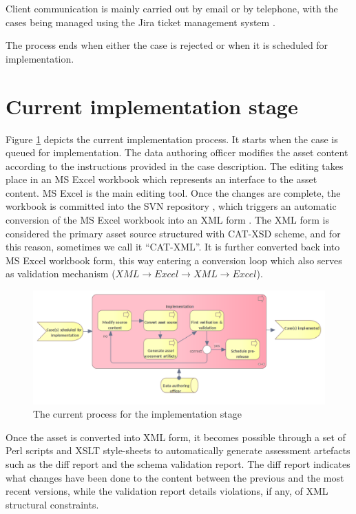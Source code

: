 	Client communication is mainly carried out by email or by telephone, with the cases being managed using the Jira ticket management system \citep{jira}. 
	
	The process ends when either the case is rejected or when it is scheduled for implementation. 

	
	\section{Current implementation stage}
	\label{sec:implementation-current}
		
	Figure \ref{fig:implementation-current} depicts the current implementation process. It starts when the case is queued for implementation. The data authoring officer modifies the asset content according to the instructions provided in the case description. The editing takes place in an MS Excel \citep{excel} workbook which represents an interface to the asset content. MS Excel is the main editing tool. Once the changes are complete, the workbook is committed into the SVN repository \citep{svn}, which triggers an automatic conversion of the MS Excel workbook into an XML form \cite{xml11-spec}. The XML form is considered the primary asset source structured with CAT-XSD scheme, and for this reason, sometimes we call it ``CAT-XML''. It is further converted back into MS Excel workbook form, this way entering a conversion loop which also serves as validation mechanism ($XML \rightarrow Excel \rightarrow XML \rightarrow Excel$).
	
	\begin{figure}[h]
		\centering
		\includegraphics[width=.9\textwidth]{images/business/current/Implementation.png}
		\caption{The current process for the implementation stage}
		\label{fig:implementation-current}
	\end{figure}
	
	Once the asset is converted into XML form, it becomes possible through a set of Perl scripts and XSLT style-sheets \citep{xslt3-Kay} to automatically generate assessment artefacts such as the diff report and the schema validation report. The diff report indicates what changes have been done to the content between the previous and the most recent versions, while the validation report details violations, if any, of XML structural constraints.
	

